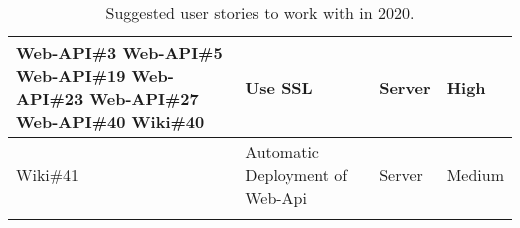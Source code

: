 \begin{longtable}{|p{2.9cm}|p{7cm}|p{1.4cm}|p{1.5cm}|}
    Web-API\#3
    Web-API\#5 
    Web-API\#19
    Web-API\#23
    Web-API\#27
    Web-API\#40                                                                                                                               
    Wiki\#40         & Use SSL                                                                                                                                                                   & Server     & High  \\ \hline
    Wiki\#41         & Automatic Deployment of Web-Api                                                                                                                                           & Server     & Medium     \\ \hline  
    \caption{Suggested user stories to work with in 2020.}
\end{longtable}

